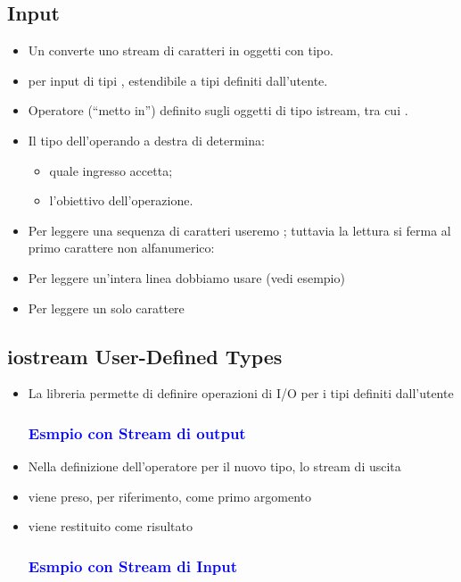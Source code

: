 \subsection{Input}
\begin{itemize}
    \item  Un  converte uno stream di caratteri in oggetti
    con tipo.
    \item {} per input di tipi , estendibile a tipi definiti
    dall’utente.
    \item Operatore \textcolor{blue}{\code{>>}} (“metto in”) definito sugli oggetti di tipo
    istream, tra cui .
    \item Il tipo dell’operando a destra di \textcolor{blue}{\code{>>}} determina:
    \begin{itemize}
        \item quale ingresso accetta;
        \item l’obiettivo dell’operazione.
    \end{itemize}
    
    \item Per leggere una sequenza di caratteri useremo \textcolor{blue}{};
    tuttavia la lettura si ferma al primo carattere non
    alfanumerico:
    
    \item  Per leggere un’intera linea dobbiamo usare 
    (vedi esempio)
    \item  Per leggere un solo carattere 
\end{itemize}
\subsection{iostream User-Defined Types}
\begin{itemize}
    \item La libreria  permette di definire operazioni di I/O
    per i tipi definiti dall’utente
    \subsubsection{\textbf{\textcolor{blue}{Esmpio con Stream di output}}}
    
    \item Nella definizione dell’operatore \textcolor{blue}{\code{<<}} per il nuovo tipo, lo
    stream di uscita
    \item viene preso, per riferimento, come primo argomento
    \item viene restituito come risultato
    \newpage
    \subsubsection{\textbf{\textcolor{blue}{Esmpio con Stream di Input}}}
    
\end{itemize}
\newpage
